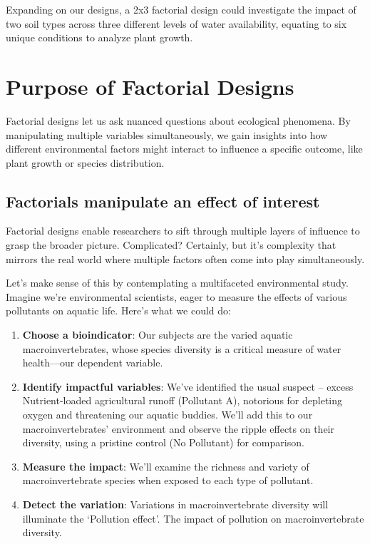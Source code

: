 \documentclass[
  letterpaper,
  DIV=11,
  numbers=noendperiod]{scrreprt}
\begin{document}
Expanding on our designs, a 2x3 factorial design could investigate the
impact of two soil types across three different levels of water
availability, equating to six unique conditions to analyze plant growth.

\section{Purpose of Factorial
Designs}\label{purpose-of-factorial-designs}

Factorial designs let us ask nuanced questions about ecological
phenomena. By manipulating multiple variables simultaneously, we gain
insights into how different environmental factors might interact to
influence a specific outcome, like plant growth or species distribution.

\subsection{Factorials manipulate an effect of
interest}\label{factorials-manipulate-an-effect-of-interest}

Factorial designs enable researchers to sift through multiple layers of
influence to grasp the broader picture. Complicated? Certainly, but it's
complexity that mirrors the real world where multiple factors often come
into play simultaneously.

Let's make sense of this by contemplating a multifaceted environmental
study. Imagine we're environmental scientists, eager to measure the
effects of various pollutants on aquatic life. Here's what we could do:

\begin{enumerate}
\def\labelenumi{\arabic{enumi}.}
\item
  \textbf{Choose a bioindicator}: Our subjects are the varied aquatic
  macroinvertebrates, whose species diversity is a critical measure of
  water health---our dependent variable.
\item
  \textbf{Identify impactful variables}: We've identified the usual
  suspect -- excess Nutrient-loaded agricultural runoff (Pollutant A),
  notorious for depleting oxygen and threatening our aquatic buddies.
  We'll add this to our macroinvertebrates' environment and observe the
  ripple effects on their diversity, using a pristine control (No
  Pollutant) for comparison.
\item
  \textbf{Measure the impact}: We'll examine the richness and variety of
  macroinvertebrate species when exposed to each type of pollutant.
\item
  \textbf{Detect the variation}: Variations in macroinvertebrate
  diversity will illuminate the `Pollution effect'. The impact of
  pollution on macroinvertebrate diversity.
\end{enumerate}
\end{document}
